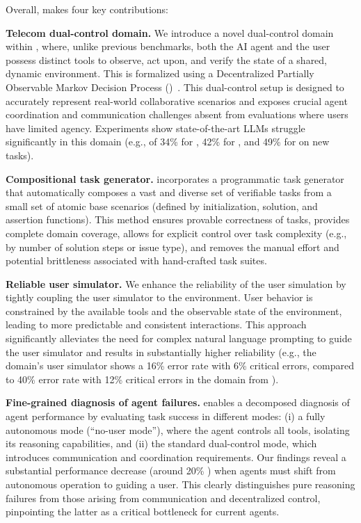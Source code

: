 Overall, \bench makes four key contributions:

\textbf{Telecom dual-control domain.} We introduce a novel dual-control \telecom domain within \bench, where, unlike previous benchmarks, both the AI agent and the user possess distinct tools to observe, act upon, and verify the state of a shared, dynamic environment. This is formalized using a Decentralized Partially Observable Markov Decision Process (\decpomdp)~\cite{oliehoek2016concise}. This dual-control setup is designed to accurately represent real-world collaborative scenarios and exposes crucial agent coordination and communication challenges absent from evaluations where users have limited agency. Experiments show state-of-the-art LLMs struggle significantly in this domain (e.g., \passone of 34\% for \gptmodelshort \cite{gpt41}, 42\% for \ofourmodelshort \cite{o4mini}, and 49\% for \claudesonnetshort \cite{claude37sonnet} on new tasks).

\textbf{Compositional task generator.} \bench incorporates a programmatic task generator that automatically composes a vast and diverse set of verifiable tasks from a small set of atomic base scenarios (defined by initialization, solution, and assertion functions). This method ensures provable correctness of tasks, provides complete domain coverage, allows for explicit control over task complexity (e.g., by number of solution steps or issue type), and removes the manual effort and potential brittleness associated with hand-crafted task suites.

\textbf{Reliable user simulator.} We enhance the reliability of the user simulation by tightly coupling the user simulator to the environment. User behavior is constrained by the available tools and the observable state of the environment, leading to more predictable and consistent interactions. This approach significantly alleviates the need for complex natural language prompting to guide the user simulator and results in substantially higher reliability (e.g., the \telecom domain's user simulator shows a 16\% error rate with 6\% critical errors, compared to 40\% error rate with 12\% critical errors in the \retail domain from \taubench).

 \textbf{Fine-grained diagnosis of agent failures.} \bench enables a decomposed diagnosis of agent performance by evaluating task success in different modes: (i) a fully autonomous mode (``no-user mode''), where the agent controls all tools, isolating its reasoning capabilities, and (ii) the standard dual-control mode, which introduces communication and coordination requirements. Our findings reveal a substantial performance decrease (around 20\% \passone) when agents must shift from autonomous operation to guiding a user. This clearly distinguishes pure reasoning failures from those arising from communication and decentralized control, pinpointing the latter as a critical bottleneck for current agents.


